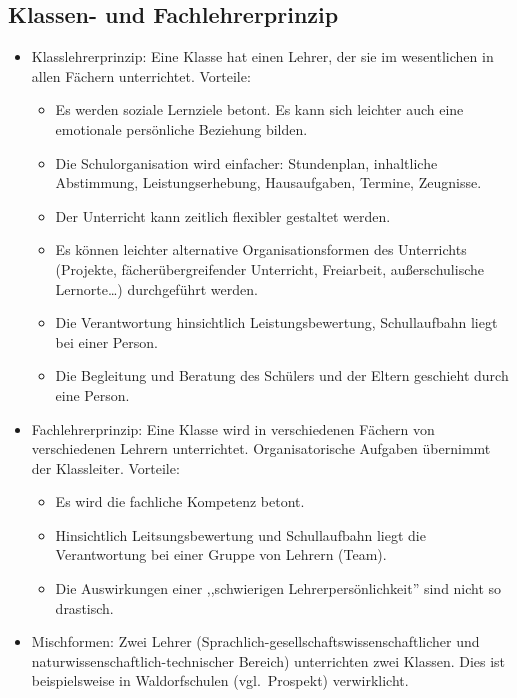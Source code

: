 \subsection{Klassen- und Fachlehrerprinzip}
\begin{itemize}
\item Klasslehrerprinzip: Eine Klasse hat einen Lehrer, der
sie im wesentlichen in allen F\"{a}chern unterrichtet.
Vorteile:
\begin{itemize}
\item Es werden soziale Lernziele betont.
Es kann sich leichter auch eine emotionale pers\"{o}nliche
Beziehung bilden.
\item Die Schulorganisation wird einfacher: Stundenplan, inhaltliche
Abstimmung, Leistungserhebung, Hausaufgaben, Termine, Zeugnisse.
\item Der Unterricht kann zeitlich flexibler gestaltet werden.
\item Es k\"{o}nnen leichter alternative Organisationsformen des
Unterrichts (Projekte, f\"{a}\-cher\-\"{u}ber\-grei\-fen\-der Unterricht,
Freiarbeit, au{\ss}erschulische Lernorte\dots) durchgef\"{u}hrt werden.
\item Die Verantwortung hinsichtlich Leistungsbewertung,
Schullaufbahn liegt bei einer Person.
\item Die Begleitung und Beratung des Sch\"{u}lers und der
Eltern geschieht durch eine Person.
\end{itemize}

\item Fachlehrerprinzip:
Eine Klasse wird in verschiedenen F\"{a}chern von
verschiedenen Lehrern unterrichtet.
Organisatorische Aufgaben \"{u}bernimmt der Klassleiter.
Vorteile:
\begin{itemize}
\item Es wird die fachliche Kompetenz betont.
\item Hinsichtlich Leitsungsbewertung und Schullaufbahn liegt die
Verantwortung bei einer Gruppe von Lehrern (Team).
\item Die Auswirkungen einer
,,schwierigen Lehrerpers\"{o}nlichkeit'' sind nicht so drastisch.
\end{itemize}
\item Mischformen: Zwei Lehrer
(Sprachlich-gesellschaftswissenschaftlicher
und natur\-wis\-sen\-schaft\-lich-technischer Bereich)
unterrichten zwei Klassen.
Dies ist beispielsweise in Waldorfschulen (vgl.\ Prospekt)
verwirklicht.
\end{itemize}


